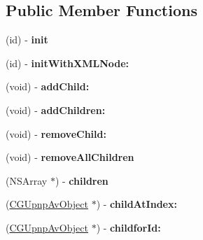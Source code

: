 \subsection*{Public Member Functions}
\begin{DoxyCompactItemize}
\item 
\hypertarget{interface_c_g_upnp_av_container_ac0c5805d0f0d7bc5f11fa6a04f2ea86a}{(id) -\/ {\bfseries init}}\label{interface_c_g_upnp_av_container_ac0c5805d0f0d7bc5f11fa6a04f2ea86a}

\item 
\hypertarget{interface_c_g_upnp_av_container_a64779b5efd68bd1f22031dcc14a3bd65}{(id) -\/ {\bfseries init\-With\-X\-M\-L\-Node\-:}}\label{interface_c_g_upnp_av_container_a64779b5efd68bd1f22031dcc14a3bd65}

\item 
\hypertarget{interface_c_g_upnp_av_container_ab5b6946c250d1299bb67672f60c5a4f1}{(void) -\/ {\bfseries add\-Child\-:}}\label{interface_c_g_upnp_av_container_ab5b6946c250d1299bb67672f60c5a4f1}

\item 
\hypertarget{interface_c_g_upnp_av_container_ade3127cfcd51abde17acd58f891e2c52}{(void) -\/ {\bfseries add\-Children\-:}}\label{interface_c_g_upnp_av_container_ade3127cfcd51abde17acd58f891e2c52}

\item 
\hypertarget{interface_c_g_upnp_av_container_afc13d6b831caae86f3919f6df671b171}{(void) -\/ {\bfseries remove\-Child\-:}}\label{interface_c_g_upnp_av_container_afc13d6b831caae86f3919f6df671b171}

\item 
\hypertarget{interface_c_g_upnp_av_container_a8c919cccc71647d567db08efc49cf6fd}{(void) -\/ {\bfseries remove\-All\-Children}}\label{interface_c_g_upnp_av_container_a8c919cccc71647d567db08efc49cf6fd}

\item 
\hypertarget{interface_c_g_upnp_av_container_af39eed4ca2dfc01dbce6dda0fb637349}{(N\-S\-Array $\ast$) -\/ {\bfseries children}}\label{interface_c_g_upnp_av_container_af39eed4ca2dfc01dbce6dda0fb637349}

\item 
\hypertarget{interface_c_g_upnp_av_container_a760a1b216ba18acfab16d44371bbb197}{(\hyperlink{interface_c_g_upnp_av_object}{C\-G\-Upnp\-Av\-Object} $\ast$) -\/ {\bfseries child\-At\-Index\-:}}\label{interface_c_g_upnp_av_container_a760a1b216ba18acfab16d44371bbb197}

\item 
\hypertarget{interface_c_g_upnp_av_container_a7351070a4e4421a6050b339ed309fbd5}{(\hyperlink{interface_c_g_upnp_av_object}{C\-G\-Upnp\-Av\-Object} $\ast$) -\/ {\bfseries childfor\-Id\-:}}\label{interface_c_g_upnp_av_container_a7351070a4e4421a6050b339ed309fbd5}


\end{DoxyCompactItemize}
